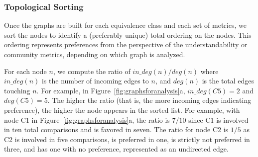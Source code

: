 \subsubsection{Topological Sorting}
Once the graphs are built for each equivalence class and each set of metrics, we sort the nodes to identify a (preferably unique) total ordering on the nodes. This ordering represents preferences from the perspective of the understandability or community metrics, depending on which graph is analyzed.  

For each node $n$, we compute the ratio of $in\_deg(n) / deg(n)$ where $in\_deg(n)$ is the number of incoming edges to $n$, and $deg(n)$ is the total edges touching $n$. For example, in Figure~\ref{fig:graphsforanalysis}a, $in\_deg(C5) = 2$ and $deg(C5) = 5$. 
The higher the ratio (that is, the more incoming edges indicating preference), the higher the node appears in the sorted list. For example, with node C1 in Figure~\ref{fig:graphsforanalysis}a, the ratio is $7 / 10$ since C1 is involved in ten total comparisons and is favored in seven. The ratio for node C2 is $1 / 5$ as C2 is involved in five comparisons, is preferred in one, is strictly not preferred in three, and has one with no preference, represented as an undirected edge. 

